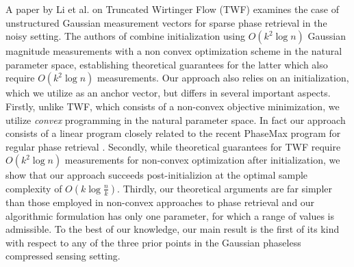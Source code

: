 \documentclass[12pt]{article}
\newcommand{\1}{\mathbf{1}}
\begin{document}
A paper by Li et al. on Truncated Wirtinger Flow (TWF) \cite{cai2015optimal} examines the case of unstructured Gaussian measurement vectors for sparse phase retrieval in the noisy setting. The authors of \cite{cai2015optimal} combine initialization using $O(k^2 \log n)$ Gaussian magnitude measurements with a non convex optimization scheme in the natural parameter space, establishing theoretical guarantees for the latter which also require $O(k^2 \log n)$ measurements. Our approach also relies on an initialization, which we utilize as an anchor vector, but differs in several important aspects. Firstly, unlike TWF, which consists of a non-convex objective minimization, we utilize \emph{convex} programming in the natural parameter space. In fact our approach consists of a linear program closely related to the recent PhaseMax program for regular phase retrieval \cite{phasemaxJustin, phasemax, phasemaxelementary}. Secondly, while theoretical guarantees for TWF require $O(k^2 \log n)$ measurements for non-convex optimization after initialization, we show that our approach succeeds post-initializion at the optimal sample complexity of $O(k \log \frac{n}{k})$. Thirdly, our theoretical arguments are far simpler than those employed in non-convex approaches to phase retrieval and our algorithmic formulation has only one parameter, for which a range of values is admissible. To the best of our knowledge, our main result is the first of its kind with respect to any of the three prior points in the Gaussian phaseless compressed sensing setting.

\end{document}
